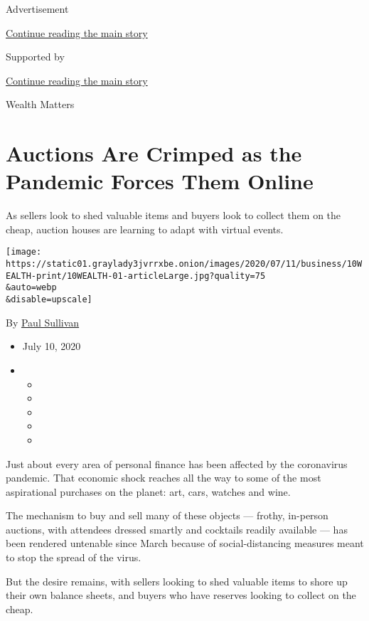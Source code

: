 Advertisement

\protect\hyperlink{after-top}{Continue reading the main story}

Supported by

\protect\hyperlink{after-sponsor}{Continue reading the main story}

Wealth Matters

\hypertarget{auctions-are-crimped-as-the-pandemic-forces-them-online}{%
\section{Auctions Are Crimped as the Pandemic Forces Them
Online}\label{auctions-are-crimped-as-the-pandemic-forces-them-online}}

As sellers look to shed valuable items and buyers look to collect them
on the cheap, auction houses are learning to adapt with virtual events.

\texttt{[image: https://static01.graylady3jvrrxbe.onion/images/2020/07/11/business/10WEALTH-print/10WEALTH-01-articleLarge.jpg?quality=75\\\&auto=webp\\\&disable=upscale]}

By \href{https://www.nytimes3xbfgragh.onion/by/paul-sullivan}{Paul
Sullivan}

\begin{itemize}
\item
  July 10, 2020
\item
  \begin{itemize}
  \item
  \item
  \item
  \item
  \item
  \end{itemize}
\end{itemize}

Just about every area of personal finance has been affected by the
coronavirus pandemic. That economic shock reaches all the way to some of
the most aspirational purchases on the planet: art, cars, watches and
wine.

The mechanism to buy and sell many of these objects --- frothy,
in-person auctions, with attendees dressed smartly and cocktails readily
available --- has been rendered untenable since March because of
social-distancing measures meant to stop the spread of the virus.

But the desire remains, with sellers looking to shed valuable items to
shore up their own balance sheets, and buyers who have reserves looking
to collect on the cheap.

